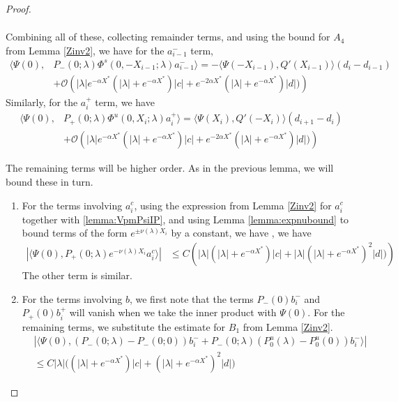 \documentclass[thesis.tex]{subfiles}
\begin{document}
\begin{lemma}
\begin{proof}
\begin{enumerate}
\begin{align*}
\end{align*}
Combining all of these, collecting remainder terms, and using the bound for $A_4$ from Lemma \ref{Zinv2}, we have for the $a_{i-1}^-$ term,
\begin{align*}
\langle \Psi(0), &P_-(0; \lambda) \Phi^s(0, -X_{i-1}; \lambda) a_{i-1}^- \rangle = -\langle \Psi(-X_{i-1}), Q'(X_{i-1}) \rangle (d_i - d_{i-1} ) \\
&+ \mathcal{O} \left( |\lambda|e^{-\alpha X^*}(|\lambda| + e^{-\alpha X^*})|c| + e^{-2 \alpha X^*} (|\lambda| + e^{-\alpha X^*}) |d| ) \right)
\end{align*}
Similarly, for the $a_i^+$ term, we have
\begin{align*}
\langle \Psi(0), &P_+(0; \lambda) \Phi^u(0, X_i; \lambda) a_i^+ \rangle = \langle \Psi(X_i), Q'(-X_i) \rangle (d_{i+1} - d_i ) \\
&+ \mathcal{O} \left( |\lambda|e^{-\alpha X^*}(|\lambda| + e^{-\alpha X^*})|c| + e^{-2 \alpha X^*} (|\lambda| + e^{-\alpha X^*}) |d| ) \right)
\end{align*}

\end{enumerate}

The remaining terms will be higher order. As in the previous lemma, we will bound these in turn.

\begin{enumerate}

\item For the terms involving $a_i^c$, using the expression from Lemma \ref{Zinv2} for $a_i^c$ together with \cref{lemma:VpmPsiIP}, and using Lemma \ref{lemma:expnubound} to bound terms of the form $e^{\pm \nu(\lambda)X_i}$ by a constant, we have
, we have
\begin{align*}
|\langle \Psi(0), P_+(0; \lambda) e^{-\nu(\lambda)X_i} a_i^c \rangle| &\leq C \left( |\lambda|(|\lambda| + e^{-\alpha X^*})|c| + |\lambda| (|\lambda| + e^{-\alpha X^*})^2 |d|) \right)
\end{align*}
The other term is similar.

\item For the terms involving $b$, we first note that the terms $P_-(0) b_i^-$ and $P_+(0)b_i^+$ will vanish when we take the inner product with $\Psi(0)$. For the remaining terms, we substitute the estimate for $B_1$ from Lemma \ref{Zinv2}.
\begin{align*}
&|\langle \Psi(0), (P_-(0; \lambda) - P_-(0; 0))b_i^- + P_-(0; \lambda)(P_0^u(\lambda) - P_0^u(0))b_i^- \rangle | \\
&\leq C |\lambda| \Big( (|\lambda| + e^{-\alpha X^*})|c| + (|\lambda| + e^{-\alpha X^*})^2 |d| \Big)
\end{align*}


\end{enumerate}
\end{proof}
\end{lemma}
\end{document}
